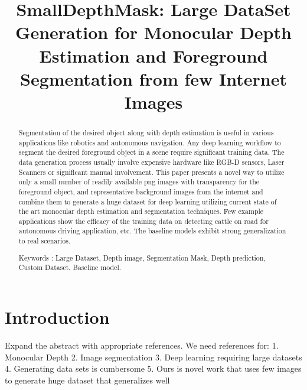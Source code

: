 \documentclass{article}
\title{SmallDepthMask: Large DataSet Generation for Monocular Depth Estimation and Foreground Segmentation from few Internet Images}
\begin{document}
\maketitle

\begin{abstract}
Segmentation of the desired object along with depth estimation is useful in various applications like robotics and autonomous navigation. 
Any deep learning workflow to segment the desired foreground object in a scene require significant training data.
The data generation process usually involve expensive hardware like RGB-D sensors, Laser Scanners or significant manual involvement. 
This paper presents a novel way to utilize only a small number of readily available png images with transparency for the foreground object, 
and representative background images from the internet and combine them to generate a huge dataset for deep learning
utilizing current state of the art monocular depth estimation and segmentation techniques. 
Few example applications show the efficacy of the training data on detecting 
cattle on road for autonomous driving application, etc. The baseline models exhibit strong generalization to real scenarios.

Keywords : Large Dataset, Depth image, Segmentation Mask, Depth prediction, Custom Dataset, Baseline model.
\end{abstract}

 

\section{Introduction}
Expand the abstract with appropriate references. We need references for:
1. Monocular Depth
2. Image segmentation
3. Deep learning requiring large datasets
4. Generating data sets is cumbersome
5. Ours is novel work that uses few images to generate huge dataset that generalizes well

\end{document}
